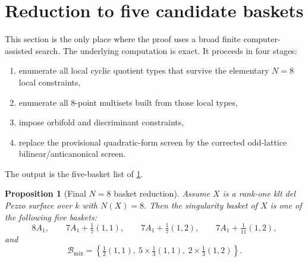 \documentclass[11pt]{article}
\newtheorem{proposition}[proposition]{Proposition}
\theoremstyle{definition}
\begin{document}
\section{Reduction to five candidate baskets}\label{sec:baskets}

This section is the only place where the proof uses a broad finite computer-assisted search. The underlying computation is exact. It proceeds in four stages:
\begin{enumerate}[label=\textup{(\arabic*)}]
\item enumerate all local cyclic quotient types that survive the elementary $N=8$ local constraints,
\item enumerate all $8$-point multisets built from those local types,
\item impose orbifold and discriminant constraints,
\item replace the provisional quadratic-form screen by the corrected odd-lattice bilinear/anticanonical screen.
\end{enumerate}
The output is the five-basket list of \cref{prop:final-baskets}.

\begin{proposition}[Final $N=8$ basket reduction]\label{prop:final-baskets}
Assume $X$ is a rank-one klt del Pezzo surface over $k$ with $N(X)=8$. Then the singularity basket of $X$ is one of the following five baskets:
\[
8A_1,
\qquad
7A_1+\tfrac17(1,1),
\qquad
7A_1+\tfrac17(1,2),
\qquad
7A_1+\tfrac1{11}(1,2),
\]
and
\[
\mathcal B_{\mathrm{mix}}=\left\{\tfrac12(1,1),\ 5\times\tfrac13(1,1),\ 2\times\tfrac13(1,2)\right\}.
\]
\end{proposition}
\end{document}

